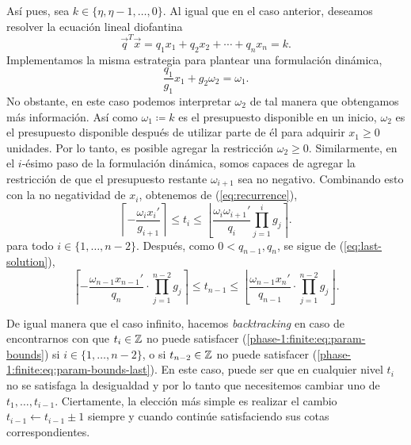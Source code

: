 Así pues, sea $k \in \lbrace \eta, \eta - 1, \ldots, 0 \rbrace$. Al igual que en el caso anterior,
deseamos resolver la ecuación lineal diofantina
\begin{equation*}
	\vec{q}^T\vec{x} = q_1x_1 + q_2x_2 + \cdots + q_nx_n = k.
\end{equation*}
Implementamos la misma estrategia para plantear una formulación dinámica,
\begin{equation*}
	\frac{q_1}{g_1}x_1 + g_2\omega_2 = \omega_1.
\end{equation*}
No obstante, en este caso podemos interpretar $\omega_2$ de tal manera que obtengamos más
información. Así como $\omega_1 \coloneq k$  es el presupuesto disponible en un inicio, $\omega_2$
es el presupuesto disponible después de utilizar parte de él para adquirir $x_1 \geq 0$ unidades.
Por lo tanto, es posible agregar la restricción $\omega_2 \geq 0$. Similarmente, en el $i$-ésimo
paso de la formulación dinámica, somos capaces de agregar la restricción de que el presupuesto
restante $\omega_{i + 1}$ sea no negativo. Combinando esto con la no negatividad de $x_i$, obtenemos
de (\ref{eq:recurrence}),
\begin{equation}
	\label{phase-1:finite:eq:param-bounds}
	\left\lceil -\frac{\omega_ix_i'}{g_{i+1}} \right\rceil
	\leq
	t_i
	\leq
	\left\lfloor \frac{\omega_i\omega_{i+1}'}{q_i} \prod_{j=1}^{i}g_j \right\rceil.
\end{equation}
para todo $i \in \lbrace 1, \ldots, n - 2\rbrace$. Después, como $0 < q_{n - 1}, q_n$, se sigue de
(\ref{eq:last-solution}),
\begin{equation}
	\label{phase-1:finite:eq:param-bounds-last}
	\left\lceil -\frac{\omega_{n-1}x_{n-1}'}{q_n} \cdot \prod_{j=1}^{n-2}g_j \right\rceil
	\leq
	t_{n - 1}
	\leq
	\left\lfloor \frac{\omega_{n-1}x_{n}'}{q_{n-1}} \cdot \prod_{j=1}^{n-2}g_j \right\rfloor.
\end{equation}

De igual manera que el caso infinito, hacemos \textit{backtracking} en caso de encontrarnos con que
$t_i \in \mathbb{Z}$ no puede satisfacer (\ref{phase-1:finite:eq:param-bounds}) si $i \in \lbrace 1, \ldots,
n - 2\rbrace$, o si $t_{n - 2} \in \mathbb{Z}$ no puede satisfacer
(\ref{phase-1:finite:eq:param-bounds-last}). En este caso, puede ser que en cualquier nivel $t_i$ no
se satisfaga la desigualdad y por lo tanto que necesitemos cambiar uno de $t_1, \ldots, t_{i -
1}$. Ciertamente, la elección más simple es realizar el cambio $t_{i - 1} \leftarrow t_{i - 1} \pm
1$ siempre y cuando continúe satisfaciendo sus cotas correspondientes.

